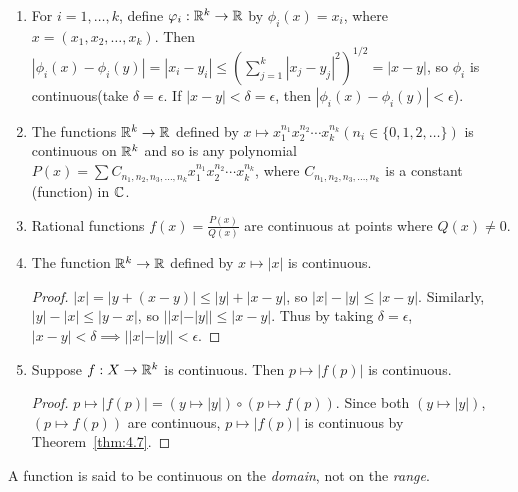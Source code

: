 \begin{example}
	\label{eg:4.11}
	\begin{enumerate}
		\item For $i=1,\ldots ,k$, define $\varphi_i: \mathbb{R}^{k}\to \mathbb{R}$ by $\phi_i(x)=x_i$, where $x=(x_1,x_2,\ldots ,x_k)$. Then $|\phi_{i}(x)-\phi_{i}(y)|=|x_i-y_i|\le \left( \sum_{j=1}^{k}{|x_j-y_j|^{2}} \right)^{1/2}=|x-y|$, so $\phi_{i}$ is continuous(take $\delta=\epsilon$. If $|x-y|<\delta=\epsilon$, then $|\phi_{i}(x)-\phi_{i}(y)|<\epsilon$).
		\item The functions $\mathbb{R}^{k}\to \mathbb{R}$ defined by $x \mapsto x_1^{n_1}x_2^{n_2}\cdots x_k^{n_k}(n_i \in \{0,1,2,\ldots \})$ is continuous on $\mathbb{R}^{k}$ and so is any polynomial $P(x)=\sum{C_{n_1,n_2,n_3,\ldots ,n_k}x_1^{n_1} x_2^{n_2}\cdots x_k^{n_k}}$, where $C_{n_1,n_2,n_3,\ldots ,n_k}$ is a constant (function) in $\mathbb{C}$.
		\item Rational functions $f(x)=\frac{P(x)}{Q(x)}$ are continuous at points where $Q(x)\neq 0$.
		\item The function $\mathbb{R}^{k} \to \mathbb{R}$ defined by $x \mapsto |x|$ is continuous.
		      \begin{proof}
			      $|x|=|y+(x-y)|\le |y|+|x-y|$, so $|x|-|y|\le |x-y|$. Similarly, $|y|-|x|\le |y-x|$, so $||x|-|y||\le |x-y|$. Thus by taking $\delta=\epsilon$, $|x-y|<\delta \implies ||x|-|y||<\epsilon$.
		      \end{proof}
		\item Suppose $f: X\to \mathbb{R}^{k}$ is continuous. Then $p \mapsto |f(p)|$ is continuous.
		      \begin{proof}
			      $p \mapsto |f(p)|= (y \mapsto |y|) \circ (p \mapsto f(p))$.
			      Since both $(y \mapsto |y|)$, $(p \mapsto f(p))$ are continuous, $p \mapsto |f(p)|$ is continuous by Theorem~\ref{thm:4.7}.
		      \end{proof}
	\end{enumerate}
\end{example}
\begin{note}
	A function is said to be continuous on the \textit{domain}, not on the \textit{range}.
\end{note}

